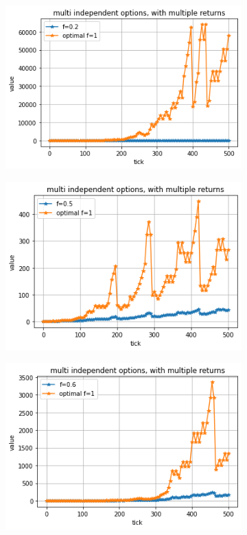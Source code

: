 \documentclass{article}
\begin{document}
	\begin{figure}[!h]
		\begin{subfigure}{0.525\textwidth}
			\includegraphics[width=0.9\linewidth]{single1} 
		\end{subfigure}
		\begin{subfigure}{0.525\textwidth}
			\includegraphics[width=0.9\linewidth]{single2}
		\end{subfigure}
		\begin{subfigure}{0.525\textwidth}
			\includegraphics[width=0.9\linewidth]{single3}

\end{subfigure}
\end{figure}
\end{document}
